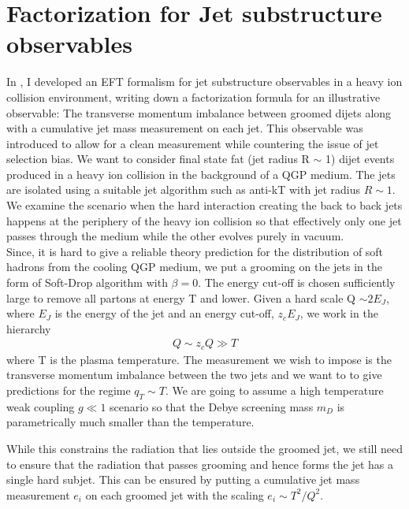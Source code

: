 \documentclass[letter,11pt]{article}
\newcommand{\bea}{\begin{eqnarray}}
\newcommand{\eea}{\end{eqnarray}}
\begin{document}
\section{Factorization for Jet substructure observables}
\label{sec:Fact}
In \cite{Vaidya:2020lih}, I developed an EFT formalism for jet substructure observables in a heavy ion collision environment, writing down a factorization formula for an illustrative observable: The transverse momentum imbalance between groomed dijets along with a cumulative jet mass measurement on each jet. This observable was introduced to allow for a clean measurement while countering the issue of jet selection bias. 
We want to consider final state fat (jet radius R $\sim $ 1) dijet events produced in a heavy ion collision in the background of a QGP medium. The jets are isolated using a suitable jet algorithm such as anti-kT with jet radius $R\sim 1$. We examine the scenario when the hard interaction creating the back to back jets happens at the periphery of the heavy ion collision so that effectively only one jet passes through the medium while the other evolves purely in vacuum. \\
Since, it is hard to give a reliable theory prediction for the distribution of soft hadrons from the cooling QGP medium, we put a grooming on the jets in the form of Soft-Drop algorithm \cite{Larkoski:2014wba} with $\beta=0$. The energy cut-off is chosen sufficiently large to remove all partons at energy T and lower. Given a hard scale Q $\sim 2E_J$, where $E_J$ is the energy of the jet and an energy cut-off, $z_{c}E_J$, we work in the hierarchy 
\bea
Q \sim z_{c}Q \gg T 
\eea
where T is the plasma temperature.  The measurement we wish to impose is the transverse momentum imbalance between the two jets and we want to to give predictions for the regime $q_T \sim T$. We are going to assume a high temperature weak coupling $g \ll 1$ scenario so that the Debye screening mass $m_D$ is parametrically much smaller than the temperature.

While this constrains the radiation that lies outside the groomed jet, we still need to ensure that the radiation that passes grooming and hence forms the jet has a single hard subjet. This can be ensured by putting a cumulative jet mass measurement $e_i$ on each groomed jet with the scaling $e_i \sim  T^2/Q^2 $. 
 
\end{document}
